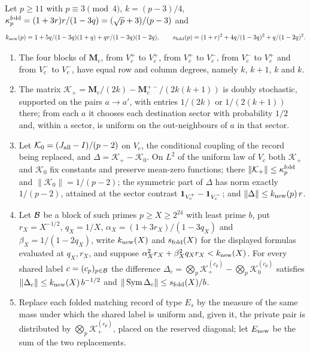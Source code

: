 \begin{lemma}\label{lem:record:one-stage-folded-e}
Let $p\ge11$ with $p\equiv3\pmod4$, $k=(p-3)/4$,
$\kappa^{\rm fold}_p=(1+3r)r/(1-3q)=(\sqrt p+3)/(p-3)$ and
\[
 k_{\rm new}(p)=\frac{1+5q}{(1-3q)(1+q)}+\frac{qr}{(1-3q)(1-2q)},\qquad
 s_{\rm fold}(p)=\frac{(1+r)^2+4q}{(1-3q)^2}+\frac q{(1-2q)^2}.
\]
\begin{enumerate}[label=(\alph*)]
\item The four blocks of $\mathbf M_c$, from $V_c^+$ to $V_c^+$, from $V_c^+$
 to $V_c^-$, from $V_c^-$ to $V_c^+$ and from $V_c^-$ to $V_c^-$, have equal
 row and column degrees, namely $k$, $k+1$, $k$ and $k$.
\item The matrix $\mathcal K_+=\mathbf M_c/(2k)-\mathbf M_c^{+-}/(2k(k+1))$ is
 doubly stochastic, supported on the pairs $a\to a'$, with entries $1/(2k)$
 or $1/(2(k+1))$ there; from each $a$ it chooses each destination sector
 with probability $1/2$ and, within a sector, is uniform on the out-neighbours of $a$ in that sector.
\item Let $\mathcal K_0=(\Jall-I)/(p-2)$ on $V_c$, the conditional coupling of
 the record being replaced, and $\Delta=\mathcal K_+-\mathcal K_0$. On $L^2$ of
 the uniform law of $V_c$ both $\mathcal K_+$ and $\mathcal K_0$ fix constants
 and preserve mean-zero functions; there
 $\|\mathcal K_+\|\le\kappa^{\rm fold}_p$ and $\|\mathcal K_0\|=1/(p-2)$; the
 symmetric part of $\Delta$ has norm exactly $1/(p-2)$, attained at the
 sector contrast $\one_{V_c^+}-\one_{V_c^-}$; and
 $\|\Delta\|\le k_{\rm new}(p)\,r$.
\item Let $\Blk$ be a block of such primes $p\ge X\ge2^{24}$ with least prime
 $b$, put $r_X=X^{-1/2}$, $q_X=1/X$, $\alpha_X=(1+3r_X)/(1-3q_X)$ and
 $\beta_X=1/(1-2q_X)$, write $k_{\rm new}(X)$ and $s_{\rm fold}(X)$ for the displayed formulas evaluated at $q_X,r_X$, and suppose
 $\alpha_X^2r_X+\beta_X^2q_Xr_X<k_{\rm new}(X)$. For every shared label
 $c=(c_p)_{p\in\Blk}$ the difference
 $\Delta_c=\bigotimes_p\mathcal K_+^{(c_p)}-\bigotimes_p\mathcal K_0^{(c_p)}$
 satisfies $\|\Delta_c\|\le k_{\rm new}(X)\,b^{-1/2}$ and
 $\|\operatorname{Sym}\Delta_c\|\le s_{\rm fold}(X)/b$.
\item Replace each folded matching record of type $E_s$ by the measure of
 the same mass under which the shared label is uniform and, given it, the
 private pair is distributed by $\bigotimes_p\mathcal K_+^{(c_p)}$, placed on
 the reserved diagonal; let $E_{\rm new}$ be the sum of the two replacements.

\end{enumerate}
\end{lemma}
